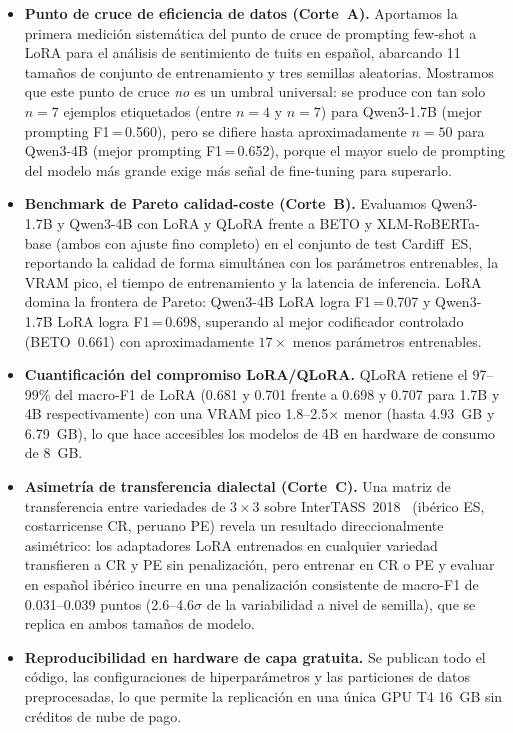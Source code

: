\documentclass[conference]{IEEEtran}
\begin{document}
\begin{itemize}
  \item \textbf{Punto de cruce de eficiencia de datos (Corte~A).} Aportamos la
    primera medición sistemática del punto de cruce de prompting few-shot a LoRA
    para el análisis de sentimiento de tuits en español, abarcando 11 tamaños de
    conjunto de entrenamiento y tres semillas aleatorias.
    Mostramos que este punto de cruce \emph{no} es un umbral universal: se
    produce con tan solo $n=7$ ejemplos etiquetados (entre
    $n=4$ y $n=7$) para Qwen3-1.7B (mejor prompting F1\,=\,0.560), pero se
    difiere hasta aproximadamente $n=50$ para
    Qwen3-4B (mejor prompting F1\,=\,0.652), porque el mayor suelo de prompting
    del modelo más grande exige más señal de fine-tuning para superarlo.

  \item \textbf{Benchmark de Pareto calidad-coste (Corte~B).} Evaluamos
    Qwen3-1.7B y Qwen3-4B con LoRA y QLoRA frente a BETO y
    XLM-RoBERTa-base (ambos con ajuste fino completo) en el conjunto de test
    Cardiff~ES, reportando la calidad de forma simultánea con los parámetros
    entrenables, la VRAM pico, el tiempo de entrenamiento y la latencia de
    inferencia.
    LoRA domina la frontera de Pareto: Qwen3-4B LoRA logra F1\,=\,0.707 y
    Qwen3-1.7B LoRA logra F1\,=\,0.698, superando al mejor codificador
    controlado (BETO~0.661) con aproximadamente $17\times$ menos parámetros
    entrenables.

  \item \textbf{Cuantificación del compromiso LoRA/QLoRA.} QLoRA retiene el
    97--99\% del macro-F1 de LoRA (0.681 y 0.701 frente a 0.698 y 0.707 para
    1.7B y 4B respectivamente) con una VRAM pico 1.8--2.5$\times$ menor (hasta
    4.93~GB y 6.79~GB), lo que hace accesibles los modelos de 4B en hardware de
    consumo de 8~GB.

  \item \textbf{Asimetría de transferencia dialectal (Corte~C).} Una matriz de
    transferencia entre variedades de $3\times3$ sobre InterTASS~2018~\cite{martinezcamara2018tass}
    (ibérico ES, costarricense CR, peruano PE) revela un resultado
    direccionalmente asimétrico: los adaptadores LoRA entrenados en cualquier
    variedad transfieren a CR y PE sin penalización, pero entrenar en CR o
    PE y evaluar en español ibérico incurre en una penalización consistente de
    macro-F1 de 0.031--0.039 puntos (2.6--4.6$\sigma$ de la variabilidad a nivel
    de semilla), que se replica en ambos tamaños de modelo.

  \item \textbf{Reproducibilidad en hardware de capa gratuita.} Se publican todo
    el código, las configuraciones de hiperparámetros y las particiones de datos
    preprocesadas, lo que permite la replicación en una única GPU T4 16~GB sin
    créditos de nube de pago.
\end{itemize}
\end{document}
